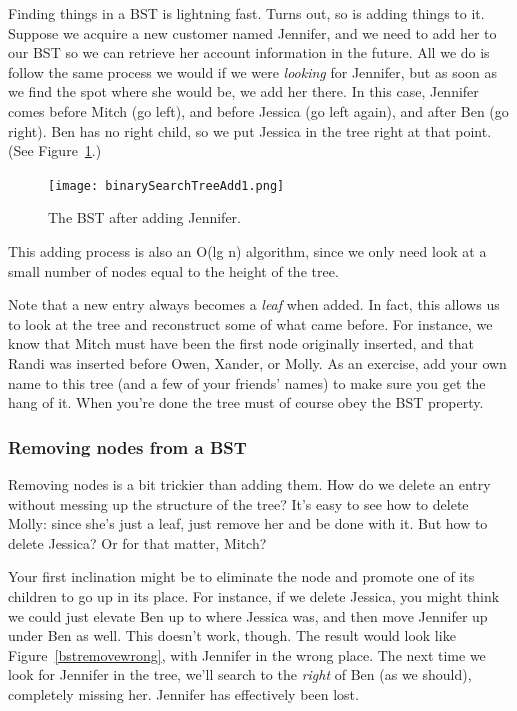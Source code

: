 Finding things in a BST is lightning fast. Turns out, so is adding things
to it. Suppose we acquire a new customer named Jennifer, and we need to add
her to our BST so we can retrieve her account information in the future.
All we do is follow the same process we would if we were \textit{looking}
for Jennifer, but as soon as we find the spot where she would be, we add
her there. In this case, Jennifer comes before Mitch (go left), and before
Jessica (go left again), and after Ben (go right). Ben has no right child,
so we put Jessica in the tree right at that point. (See
Figure~\ref{bstadd1}.)

\begin{figure}[ht]
\centering
\texttt{[image: binarySearchTreeAdd1.png]}
\caption{The BST after adding Jennifer.}
\label{bstadd1}
\end{figure}

This adding process is also an O(lg n) algorithm, since we only need look
at a small number of nodes equal to the height of the tree.

Note that a new entry always becomes a \textit{leaf} when added. In fact,
this allows us to look at the tree and reconstruct some of what came
before. For instance, we know that Mitch must have been the first node
originally inserted, and that Randi was inserted before Owen, Xander, or
Molly. As an exercise, add your own name to this tree (and a few of your
friends' names) to make sure you get the hang of it. When you're done the
tree must of course obey the BST property.

\subsubsection{Removing nodes from a BST}

Removing nodes is a bit trickier than adding them. How do we delete an
entry without messing up the structure of the tree? It's easy to see how to
delete Molly: since she's just a leaf, just remove her and be done with it.
But how to delete Jessica? Or for that matter, Mitch?

Your first inclination might be to eliminate the node and promote one of its
children to go up in its place. For instance, if we delete Jessica, you might
think we could just elevate Ben up to where Jessica was, and then move Jennifer
up under Ben as well. This doesn't work, though. The result would look like
Figure~\ref{bstremovewrong}, with Jennifer in the wrong place. The next time we
look for Jennifer in the tree, we'll search to the \textit{right} of Ben (as we
should), completely missing her. Jennifer has effectively been lost.

